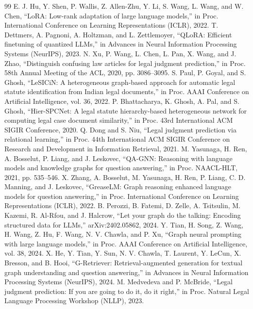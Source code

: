 \begin{thebibliography}{99}
 E. J. Hu, Y. Shen, P. Wallis, Z. Allen-Zhu, Y. Li, S. Wang, L. Wang, and W. Chen, ``LoRA: Low-rank adaptation of large language models,'' in Proc. International Conference on Learning Representations (ICLR), 2022.
 T. Dettmers, A. Pagnoni, A. Holtzman, and L. Zettlemoyer, ``QLoRA: Efficient finetuning of quantized LLMs,'' in Advances in Neural Information Processing Systems (NeurIPS), 2023.
 N. Xu, P. Wang, L. Chen, L. Pan, X. Wang, and J. Zhao, ``Distinguish confusing law articles for legal judgment prediction,'' in Proc. 58th Annual Meeting of the ACL, 2020, pp. 3086--3095.
 S. Paul, P. Goyal, and S. Ghosh, ``LeSICiN: A heterogeneous graph-based approach for automatic legal statute identification from Indian legal documents,'' in Proc. AAAI Conference on Artificial Intelligence, vol. 36, 2022.
 P. Bhattacharya, K. Ghosh, A. Pal, and S. Ghosh, ``Hier-SPCNet: A legal statute hierarchy-based heterogeneous network for computing legal case document similarity,'' in Proc. 43rd International ACM SIGIR Conference, 2020.
 Q. Dong and S. Niu, ``Legal judgment prediction via relational learning,'' in Proc. 44th International ACM SIGIR Conference on Research and Development in Information Retrieval, 2021.
 M. Yasunaga, H. Ren, A. Bosselut, P. Liang, and J. Leskovec, ``QA-GNN: Reasoning with language models and knowledge graphs for question answering,'' in Proc. NAACL-HLT, 2021, pp. 535--546.
 X. Zhang, A. Bosselut, M. Yasunaga, H. Ren, P. Liang, C. D. Manning, and J. Leskovec, ``GreaseLM: Graph reasoning enhanced language models for question answering,'' in Proc. International Conference on Learning Representations (ICLR), 2022.
 B. Perozzi, B. Fatemi, D. Zelle, A. Tsitsulin, M. Kazemi, R. Al-Rfou, and J. Halcrow, ``Let your graph do the talking: Encoding structured data for LLMs,'' arXiv:2402.05862, 2024.
 Y. Tian, H. Song, Z. Wang, H. Wang, Z. Hu, F. Wang, N. V. Chawla, and P. Xu, ``Graph neural prompting with large language models,'' in Proc. AAAI Conference on Artificial Intelligence, vol. 38, 2024.
 X. He, Y. Tian, Y. Sun, N. V. Chawla, T. Laurent, Y. LeCun, X. Bresson, and B. Hooi, ``G-Retriever: Retrieval-augmented generation for textual graph understanding and question answering,'' in Advances in Neural Information Processing Systems (NeurIPS), 2024.
 M. Medvedeva and P. McBride, ``Legal judgment prediction: If you are going to do it, do it right,'' in Proc. Natural Legal Language Processing Workshop (NLLP), 2023.

\end{thebibliography}
